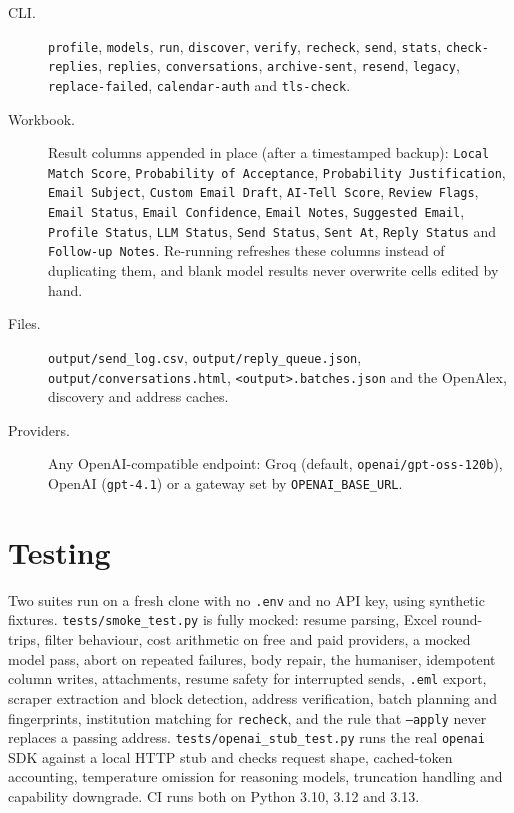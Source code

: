 \documentclass[11pt,a4paper]{article}
\newcommand{\code}[1]{\texttt{#1}}
\begin{document}
\begin{description}
  \item[CLI.] \code{profile}, \code{models}, \code{run}, \code{discover}, \code{verify},
        \code{recheck}, \code{send}, \code{stats}, \code{check-replies}, \code{replies},
        \code{conversations}, \code{archive-sent}, \code{resend}, \code{legacy},
        \code{replace-failed}, \code{calendar-auth} and \code{tls-check}.
  \item[Workbook.] Result columns appended in place (after a timestamped backup):
        \code{Local Match Score}, \code{Probability of Acceptance}, \code{Probability
        Justification}, \code{Email Subject}, \code{Custom Email Draft}, \code{AI-Tell Score},
        \code{Review Flags}, \code{Email Status}, \code{Email Confidence}, \code{Email Notes},
        \code{Suggested Email}, \code{Profile Status}, \code{LLM Status}, \code{Send Status},
        \code{Sent At}, \code{Reply Status} and \code{Follow-up Notes}. Re-running refreshes
        these columns instead of duplicating them, and blank model results never overwrite cells
        edited by hand.
  \item[Files.] \code{output/send\_log.csv}, \code{output/reply\_queue.json},
        \code{output/conversations.html}, \code{<output>.batches.json} and the OpenAlex,
        discovery and address caches.
  \item[Providers.] Any OpenAI-compatible endpoint: Groq (default, \code{openai/gpt-oss-120b}),
        OpenAI (\code{gpt-4.1}) or a gateway set by \code{OPENAI\_BASE\_URL}.
\end{description}

\section{Testing}

Two suites run on a fresh clone with no \code{.env} and no API key, using synthetic fixtures.
\code{tests/smoke\_test.py} is fully mocked: resume parsing, Excel round-trips, filter
behaviour, cost arithmetic on free and paid providers, a mocked model pass, abort on repeated
failures, body repair, the humaniser, idempotent column writes, attachments, resume safety for
interrupted sends, \code{.eml} export, scraper extraction and block detection, address
verification, batch planning and fingerprints, institution matching for \code{recheck}, and the
rule that \code{--apply} never replaces a passing address. \code{tests/openai\_stub\_test.py} runs
the real \code{openai} SDK against a local HTTP stub and checks request shape, cached-token
accounting, temperature omission for reasoning models, truncation handling and capability
downgrade. CI runs both on Python 3.10, 3.12 and 3.13.
\end{document}
